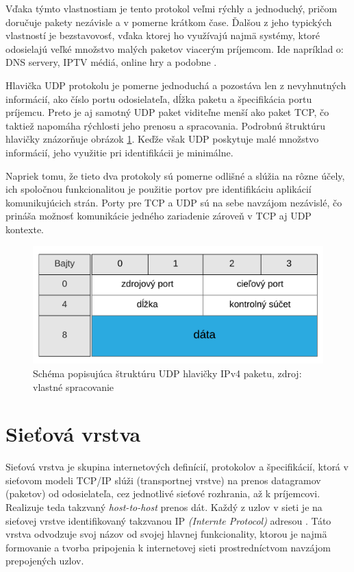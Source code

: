 \documentclass[
  printed, %
  table,   %
  lof,     %
  nolot,   %
  nocover
]{fithesis3}
\begin{document}
Vďaka týmto
vlastnostiam je tento protokol veľmi rýchly a jednoduchý, pričom doručuje
pakety nezávisle a v pomerne krátkom čase. Ďalšou z jeho typických vlastností
je bezstavovosť, vďaka ktorej ho využívajú najmä systémy, ktoré odosielajú
veľké množstvo malých paketov viacerým príjemcom. Ide napríklad o: DNS servery,
IPTV médiá, online hry a podobne \cite{FIDIS:TCP}.

Hlavička UDP protokolu je pomerne jednoduchá a pozostáva len z nevyhnutných
informácií, ako číslo portu odosielateľa, dĺžka paketu a špecifikácia portu
príjemcu. Preto je aj samotný UDP paket viditeľne menší ako paket TCP, čo
taktiež napomáha rýchlosti jeho prenosu a spracovania. Podrobnú štruktúru hlavičky
znázorňuje obrázok \ref{fig:net-udp-head}. Keďže však UDP poskytuje
malé množstvo informácií, jeho využitie pri identifikácii je minimálne.

Napriek tomu, že tieto dva protokoly sú pomerne odlišné a slúžia na rôzne
účely, ich spoločnou funkcionalitou je použitie portov pre identifikáciu
aplikácií komunikujúcich strán. Porty pre TCP a UDP sú na sebe navzájom
nezávislé, čo prináša možnosť komunikácie jedného zariadenie zároveň v TCP aj
UDP kontexte.

\begin{figure}[t]
  \centering
    \includegraphics[width=.72\textwidth]{images/net-udp-head.png}
  \caption{Schéma popisujúca štruktúru UDP hlavičky IPv4 paketu, zdroj: vlastné spracovanie}
  \label{fig:net-udp-head}
\end{figure}

\section{Sieťová vrstva}
Sieťová vrstva je skupina internetových definícií, protokolov a špecifikácií, ktorá
v sieťovom modeli TCP/IP slúži (transportnej vrstve) na prenos datagramov
(paketov) od odosielateľa, cez jednotlivé sieťové rozhrania, až k príjemcovi.
Realizuje teda takzvaný \textit{host-to-host} prenos dát.
Každý z uzlov v sieti je na sieťovej vrstve identifikovaný takzvanou IP
\textit{(Internte Protocol)} adresou \cite{rfc791}. Táto vrstva odvodzuje svoj názov od
svojej hlavnej funkcionality, ktorou je najmä formovanie a tvorba pripojenia k
internetovej sieti prostredníctvom navzájom prepojených uzlov.
\end{document}
